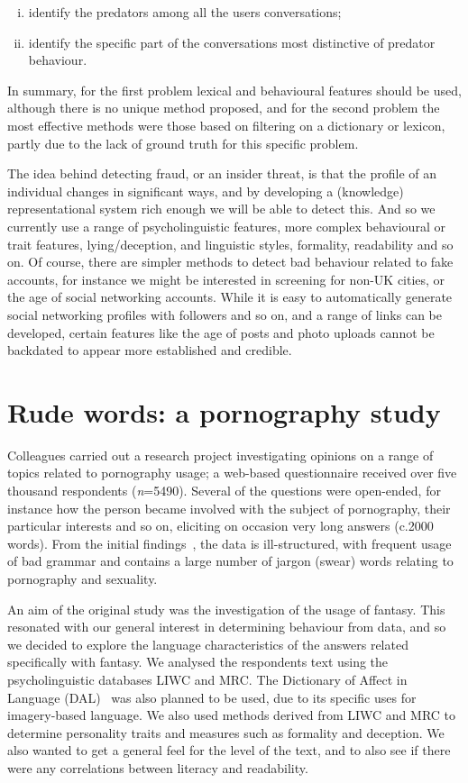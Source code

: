 \documentclass[letterpaper]{article}
\begin{document}
\begin{enumerate}[(i)]
\item identify the predators among all the users conversations;
\item identify the specific part of the conversations most distinctive
  of predator behaviour.
\end{enumerate}

In summary, for the first problem lexical and behavioural features
should be used, although there is no unique method proposed, and for
the second problem the most effective methods were those based on
filtering on a dictionary or lexicon, partly due to the lack of ground
truth for this specific problem.

The idea behind detecting fraud, or an insider threat, is that the
profile of an individual changes in significant ways, and by
developing a (knowledge) representational system rich enough we will
be able to detect this. And so we currently use a range of
psycholinguistic features, more complex behavioural or trait features,
lying/deception, and linguistic styles, formality, readability and so
on. Of course, there are simpler methods to detect bad behaviour
related to fake accounts, for instance we might be interested in
screening for non-UK cities, or the age of social networking
accounts. While it is easy to automatically generate social networking
profiles with followers and so on, and a range of links can be
developed, certain features like the age of posts and photo uploads
cannot be backdated to appear more established and credible.


\section{Rude words: a pornography study}

Colleagues carried out a research project investigating opinions on a
range of topics related to pornography usage; a web-based
questionnaire received over five thousand respondents
({\emph{n}}=5490). Several of the questions were open-ended, for instance how
the person became involved with the subject of pornography, their
particular interests and so on, eliciting on occasion very long
answers (c.2000 words). From the initial
findings~\cite{smith-et-al:2013}, the data is ill-structured, with
frequent usage of bad grammar and contains a large number of jargon
(swear) words relating to pornography and sexuality.

An aim of the original study was the investigation of the usage of
fantasy. This resonated with our general interest in determining
behaviour from data, and so we decided to explore the language
characteristics of the answers related specifically with fantasy. We
analysed the respondents text using the psycholinguistic databases
LIWC and MRC. The Dictionary of Affect in Language
(DAL)~\cite{sweeney+whissell:1984} was also planned to be used, due to
its specific uses for imagery-based language. We also used methods
derived from LIWC and MRC to determine personality traits and measures
such as formality and deception. We also wanted to get a general feel
for the level of the text, and to also see if there were any
correlations between literacy and readability.
\end{document}
